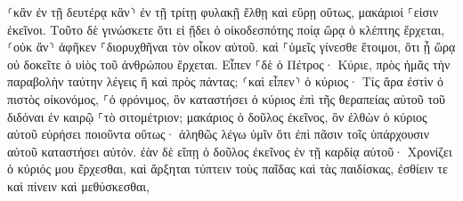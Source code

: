 \documentclass{openreader}
\begin{document}
⸂κἂν ἐν τῇ δευτέρᾳ κἂν⸃ ἐν τῇ τρίτῃ φυλακῇ ἔλθῃ καὶ εὕρῃ οὕτως, μακάριοί ⸀εἰσιν ἐκεῖνοι. 
Τοῦτο δὲ γινώσκετε ὅτι εἰ ᾔδει ὁ οἰκοδεσπότης ποίᾳ ὥρᾳ ὁ κλέπτης ἔρχεται, ⸂οὐκ ἂν⸃ ἀφῆκεν ⸀διορυχθῆναι τὸν οἶκον αὐτοῦ. 
καὶ ⸀ὑμεῖς γίνεσθε ἕτοιμοι, ὅτι ᾗ ὥρᾳ οὐ δοκεῖτε ὁ υἱὸς τοῦ ἀνθρώπου ἔρχεται. 
Εἶπεν ⸀δὲ ὁ Πέτρος· Κύριε, πρὸς ἡμᾶς τὴν παραβολὴν ταύτην λέγεις ἢ καὶ πρὸς πάντας; 
⸂καὶ εἶπεν⸃ ὁ κύριος· Τίς ἄρα ἐστὶν ὁ πιστὸς οἰκονόμος, ⸀ὁ φρόνιμος, ὃν καταστήσει ὁ κύριος ἐπὶ τῆς θεραπείας αὐτοῦ τοῦ διδόναι ἐν καιρῷ ⸀τὸ σιτομέτριον; 
μακάριος ὁ δοῦλος ἐκεῖνος, ὃν ἐλθὼν ὁ κύριος αὐτοῦ εὑρήσει ποιοῦντα οὕτως· 
ἀληθῶς λέγω ὑμῖν ὅτι ἐπὶ πᾶσιν τοῖς ὑπάρχουσιν αὐτοῦ καταστήσει αὐτόν. 
ἐὰν δὲ εἴπῃ ὁ δοῦλος ἐκεῖνος ἐν τῇ καρδίᾳ αὐτοῦ· Χρονίζει ὁ κύριός μου ἔρχεσθαι, καὶ ἄρξηται τύπτειν τοὺς παῖδας καὶ τὰς παιδίσκας, ἐσθίειν τε καὶ πίνειν καὶ μεθύσκεσθαι, 
\end{document}
